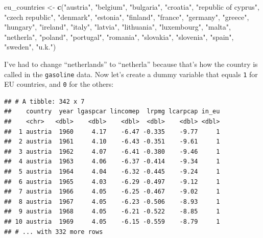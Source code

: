 \documentclass[]{gitbook}
\newenvironment{Shaded}{\begin{snugshade}}{\end{snugshade}}
\newcommand{\DataTypeTok}[1]{\textcolor[rgb]{0.13,0.29,0.53}{#1}}
\newcommand{\DecValTok}[1]{\textcolor[rgb]{0.00,0.00,0.81}{#1}}
\newcommand{\KeywordTok}[1]{\textcolor[rgb]{0.13,0.29,0.53}{\textbf{#1}}}
\newcommand{\NormalTok}[1]{#1}
\newcommand{\OperatorTok}[1]{\textcolor[rgb]{0.81,0.36,0.00}{\textbf{#1}}}
\newcommand{\StringTok}[1]{\textcolor[rgb]{0.31,0.60,0.02}{#1}}
\begin{document}
\begin{Shaded}
\begin{Highlighting}[]
\NormalTok{eu_countries <-}\StringTok{ }\KeywordTok{c}\NormalTok{(}\StringTok{"austria"}\NormalTok{, }\StringTok{"belgium"}\NormalTok{, }\StringTok{"bulgaria"}\NormalTok{, }\StringTok{"croatia"}\NormalTok{, }\StringTok{"republic of cyprus"}\NormalTok{,}
                  \StringTok{"czech republic"}\NormalTok{, }\StringTok{"denmark"}\NormalTok{, }\StringTok{"estonia"}\NormalTok{, }\StringTok{"finland"}\NormalTok{, }\StringTok{"france"}\NormalTok{, }\StringTok{"germany"}\NormalTok{,}
                  \StringTok{"greece"}\NormalTok{, }\StringTok{"hungary"}\NormalTok{, }\StringTok{"ireland"}\NormalTok{, }\StringTok{"italy"}\NormalTok{, }\StringTok{"latvia"}\NormalTok{, }\StringTok{"lithuania"}\NormalTok{, }\StringTok{"luxembourg"}\NormalTok{,}
                  \StringTok{"malta"}\NormalTok{, }\StringTok{"netherla"}\NormalTok{, }\StringTok{"poland"}\NormalTok{, }\StringTok{"portugal"}\NormalTok{, }\StringTok{"romania"}\NormalTok{, }\StringTok{"slovakia"}\NormalTok{, }\StringTok{"slovenia"}\NormalTok{,}
                  \StringTok{"spain"}\NormalTok{, }\StringTok{"sweden"}\NormalTok{, }\StringTok{"u.k."}\NormalTok{)}
\end{Highlighting}
\end{Shaded}

I've had to change ``netherlands'' to ``netherla'' because that's how the country is called in the
\texttt{gasoline} data. Now let's create a dummy variable that equals \texttt{1} for EU countries, and \texttt{0} for the others:

\begin{Shaded}
\end{Shaded}

\begin{verbatim}
## # A tibble: 342 x 7
##    country  year lgaspcar lincomep  lrpmg lcarpcap in_eu
##    <chr>   <dbl>    <dbl>    <dbl>  <dbl>    <dbl> <dbl>
##  1 austria  1960     4.17    -6.47 -0.335    -9.77     1
##  2 austria  1961     4.10    -6.43 -0.351    -9.61     1
##  3 austria  1962     4.07    -6.41 -0.380    -9.46     1
##  4 austria  1963     4.06    -6.37 -0.414    -9.34     1
##  5 austria  1964     4.04    -6.32 -0.445    -9.24     1
##  6 austria  1965     4.03    -6.29 -0.497    -9.12     1
##  7 austria  1966     4.05    -6.25 -0.467    -9.02     1
##  8 austria  1967     4.05    -6.23 -0.506    -8.93     1
##  9 austria  1968     4.05    -6.21 -0.522    -8.85     1
## 10 austria  1969     4.05    -6.15 -0.559    -8.79     1
## # ... with 332 more rows
\end{verbatim}
\end{document}

